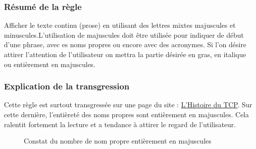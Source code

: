 \documentclass{article}[12pt]
\begin{document}
    \subsubsection*{Résumé de la règle}
    Afficher le texte continu (prose) en utilisant des lettres mixtes majuscules et minuscules.L'utilisation de majuscules doit être utilisée pour indiquer de début d'une phrase, avec es noms propres ou encore avec des acronymes. Si l'on désire attirer l'attention de l'utilisateur on mettra la partie désirée en gras, en italique ou entièrement en majuscules.
    	\newpage
    \subsubsection*{Explication de la transgression}
    Cette règle est surtout transgressée sur une page du site : \href{http://www.tennisclubdeparis.fr/historique.html}{L'Histoire du TCP}. Sur cette dernière, l'entièreté des noms propres sont entièrement en majuscules. Cela ralentit fortement la lecture et a tendance à attirer le regard de l'utilisateur.
    \begin{figure}[H]
    	\centering  {}
    	\caption{Constat du nombre de nom propre entièrement en majuscules}
    \end{figure}
\end{document}
